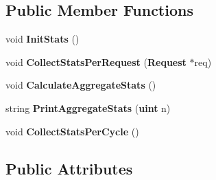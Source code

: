 \subsection*{Public Member Functions}
\begin{CompactItemize}
\item 
void {\bf InitStats} ()
\item 
void {\bf CollectStatsPerRequest} ({\bf Request} $\ast$req)
\item 
void {\bf CalculateAggregateStats} ()
\item 
string {\bf PrintAggregateStats} ({\bf uint} n)
\item 
void {\bf CollectStatsPerCycle} ()
\end{CompactItemize}
\subsection*{Public Attributes}
